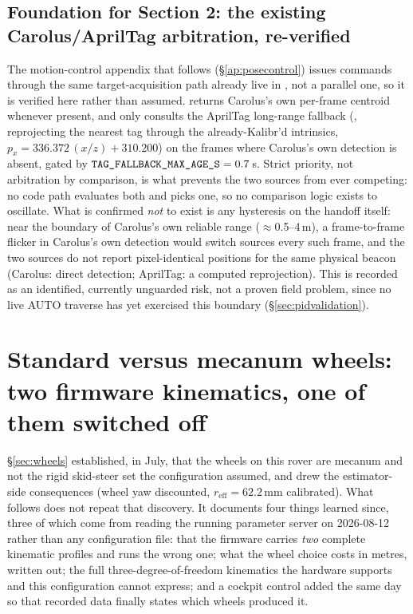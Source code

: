 \subsection{Foundation for Section 2: the existing Carolus/AprilTag
arbitration, re-verified}
\label{sec:apriltagfallback}
The motion-control appendix that follows (\S\ref{ap:posecontrol}) issues
commands through the same target-acquisition path already live in
, not a parallel one, so it is verified here rather
than assumed.  returns Carolus's own per-frame
centroid whenever present, and only consults the AprilTag long-range
fallback (, reprojecting the nearest tag through
the already-Kalibr'd  intrinsics, $p_x=336.372\,(x/z)+310.200$)
on the frames where Carolus's own detection is absent, gated by
$\code{TAG\_FALLBACK\_MAX\_AGE\_S}=0.7$\,s. Strict priority, not arbitration
by comparison, is what prevents the two sources from ever competing: no code
path evaluates both and picks one, so no comparison logic exists to
oscillate. What is confirmed \emph{not} to exist is any hysteresis on the
handoff itself: near the boundary of Carolus's own reliable range
($\approx$0.5--4\,m), a frame-to-frame flicker in Carolus's own detection
would switch sources every such frame, and the two sources do not report
pixel-identical positions for the same physical beacon (Carolus: direct
detection; AprilTag: a computed reprojection). This is recorded as an
identified, currently unguarded risk, not a proven field problem, since no
live AUTO traverse has yet exercised this boundary
(\S\ref{sec:pidvalidation}).

\section{Standard versus mecanum wheels: two firmware kinematics, one of
them switched off}
\label{sec:wheelcompare}
\S\ref{sec:wheels} established, in July, that the wheels on this rover are
mecanum and not the rigid skid-steer set the configuration assumed, and
drew the estimator-side consequences (wheel yaw discounted,
$r_{\mathrm{eff}}=62.2$\,mm calibrated). What follows does not repeat that
discovery. It documents four things learned since, three of which come from
reading the running parameter server on 2026-08-12 rather than any
configuration file: that the firmware carries \emph{two} complete kinematic
profiles and runs the wrong one; what the wheel choice costs in metres,
written out; the full three-degree-of-freedom kinematics the hardware
supports and this configuration cannot express; and a cockpit control added
the same day so that recorded data finally states which wheels produced it.

